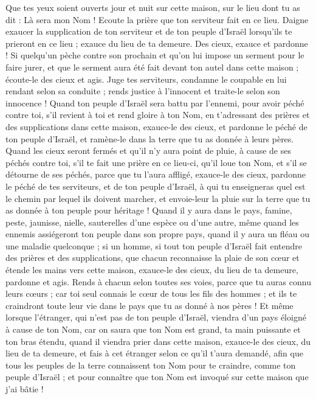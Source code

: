 \begin{multicols}{2}
Que tes yeux soient ouverts jour et nuit sur cette maison, sur le lieu dont tu as dit : Là sera mon Nom ! Ecoute la prière que ton serviteur fait en ce lieu.
Daigne exaucer la supplication de ton serviteur et de ton peuple d'Israël lorsqu'ils te prieront en ce lieu ; exauce du lieu de ta demeure. Des cieux, exauce et pardonne !
Si quelqu'un pèche contre son prochain et qu'on lui impose un serment pour le faire jurer, et que le serment aura été fait devant ton autel dans cette maison ;
écoute-le des cieux et agis. Juge tes serviteurs, condamne le coupable en lui rendant selon sa conduite ; rends justice à l'innocent et traite-le selon son innocence !
Quand ton peuple d'Israël sera battu par l'ennemi, pour avoir péché contre toi, s'il revient à toi et rend gloire à ton Nom, en t'adressant des prières et des supplications dans cette maison,
exauce-le des cieux, et pardonne le péché de ton peuple d'Israël, et ramène-le dans la terre que tu as donnée à leurs pères.
Quand les cieux seront fermés et qu'il n'y aura point de pluie, à cause de ses péchés contre toi, s'il te fait une prière en ce lieu-ci, qu'il loue ton Nom, et s'il se détourne de ses péchés, parce que tu l'aura affligé,
exauce-le des cieux, pardonne le péché de tes serviteurs, et de ton peuple d'Israël, à qui tu enseigneras quel est le chemin par lequel ils doivent marcher, et envoie-leur la pluie sur la terre que tu as donnée à ton peuple pour héritage !
Quand il y aura dans le pays, famine, peste, jaunisse, nielle, sauterelles d'une espèce ou d'une autre, même quand les ennemis assiégeront ton peuple dans son propre pays, quand il y aura un fléau ou une maladie quelconque ;
si un homme, si tout ton peuple d'Israël fait entendre des prières et des supplications, que chacun reconnaisse la plaie de son cœur et étende les mains vers cette maison,
exauce-le des cieux, du lieu de ta demeure, pardonne et agis. Rends à chacun selon toutes ses voies, parce que tu auras connu leurs cœurs ; car toi seul connais le cœur de tous les fils des hommes ;
et ils te craindront toute leur vie dans le pays que tu as donné à nos pères !
Et même lorsque l'étranger, qui n'est pas de ton peuple d'Israël, viendra d'un pays éloigné à cause de ton Nom,
car on saura que ton Nom est grand, ta main puissante et ton bras étendu, quand il viendra prier dans cette maison,
exauce-le des cieux, du lieu de ta demeure, et fais à cet étranger selon ce qu'il t'aura demandé, afin que tous les peuples de la terre connaissent ton Nom pour te craindre, comme ton peuple d'Israël ; et pour connaître que ton Nom est invoqué sur cette maison que j'ai bâtie !

\end{multicols}

